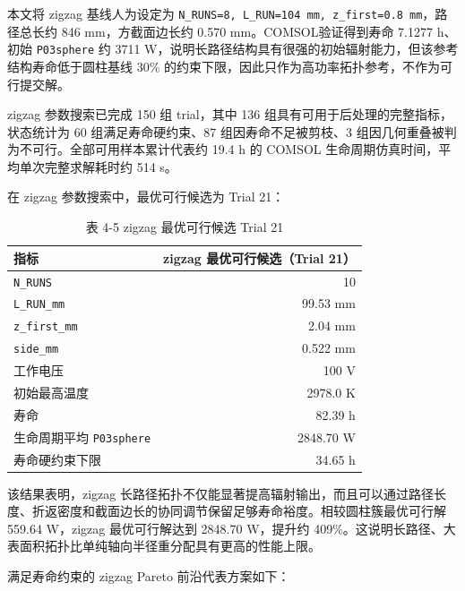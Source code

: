 \documentclass[
  a4paper,
]{ctexart}
\begin{document}
本文将 zigzag 基线人为设定为
\texttt{N\_RUNS=8,\ L\_RUN=104\ mm,\ z\_first=0.8\ mm}，路径总长约 846
mm，方截面边长约 0.570 mm。COMSOL验证得到寿命 7.1277 h、初始
\texttt{P03sphere} 约 3711 W，说明长路径结构具有很强的初始辐射能力，但该参考结构寿命低于圆柱基线 30\% 的约束下限，因此只作为高功率拓扑参考，不作为可行提交解。

zigzag 参数搜索已完成 150 组 trial，其中 136 组具有可用于后处理的完整指标，状态统计为 60 组满足寿命硬约束、87 组因寿命不足被剪枝、3 组因几何重叠被判为不可行。全部可用样本累计代表约 19.4 h 的 COMSOL 生命周期仿真时间，平均单次完整求解耗时约 514 s。

在 zigzag 参数搜索中，最优可行候选为 Trial 21：


\begin{table}[H]
\centering
\caption*{表 4-5 zigzag 最优可行候选 Trial 21}
\small
\begin{tabularx}{0.78\textwidth}{p{} R}
\toprule
指标 & zigzag 最优可行候选（Trial 21） \\
\midrule
\texttt{N\_RUNS} & 10 \\
\texttt{L\_RUN\_mm} & 99.53 mm \\
\texttt{z\_first\_mm} & 2.04 mm \\
\texttt{side\_mm} & 0.522 mm \\
工作电压 & 100 V \\
初始最高温度 & 2978.0 K \\
寿命 & 82.39 h \\
生命周期平均 \texttt{P03sphere} & 2848.70 W \\
寿命硬约束下限 & 34.65 h \\
\bottomrule
\end{tabularx}
\end{table}


该结果表明，zigzag
长路径拓扑不仅能显著提高辐射输出，而且可以通过路径长度、折返密度和截面边长的协同调节保留足够寿命裕度。相较圆柱簇最优可行解
559.64 W，zigzag 最优可行解达到 2848.70 W，提升约
409\%。这说明长路径、大表面积拓扑比单纯轴向半径重分配具有更高的性能上限。

满足寿命约束的 zigzag Pareto 前沿代表方案如下：
\end{document}
